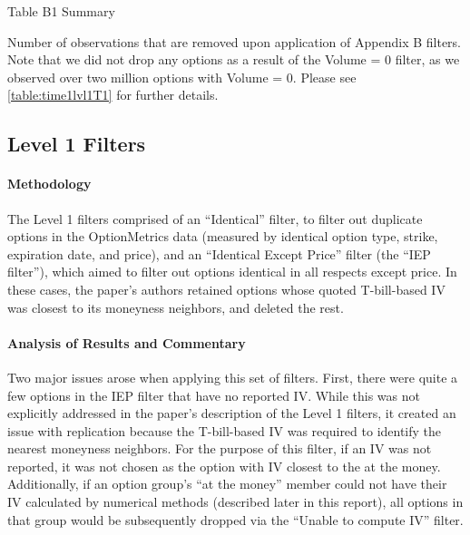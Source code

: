 \thispagestyle{empty}
\begin{landscape}

\begin{table}
  \centering
  \caption{Table B1 Summary}
  \resizebox{1.4\textwidth}{!}{
  \hspace*{-4cm}
  
  }
  \caption*{
    Number of observations that are removed upon application of Appendix B filters. Note that we did not drop any options as a result of the Volume = 0 filter, as we observed over two million options with Volume = 0. Please see \autoref{table:time1lvl1T1} for further details.
  }
  \label{table:tableB1}
\end{table}

\vfill
\raisebox{-3cm}{\makebox[\linewidth]{\thepage}}
\end{landscape}

\newpage
\subsection{Level 1 Filters} 


\paragraph{Methodology}


The Level 1 filters comprised of an ``Identical'' filter, to filter out duplicate options in the OptionMetrics data (measured by identical option type, strike, expiration date, and price), and an ``Identical Except Price'' filter (the ``IEP filter''), which aimed to filter out options identical in all respects except price. In these cases, the paper's authors retained options whose quoted T-bill-based IV was closest to its moneyness neighbors, and deleted the rest.

\paragraph{Analysis of Results and Commentary}
Two major issues arose when applying this set of filters. First, there were quite a few options in the IEP filter that have no reported IV. While this was not explicitly addressed in the paper's description of the Level 1 filters, it created an issue with replication because the T-bill-based IV was required to identify the nearest moneyness neighbors. For the purpose of this filter, if an IV was not reported, it was not chosen as the option with IV closest to the at the money. Additionally, if an option group's ``at the money'' member could not have their IV calculated by numerical methods (described later in this report), all options in that group would be subsequently dropped via the ``Unable to compute IV'' filter. 


